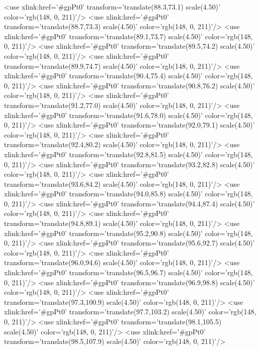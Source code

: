	<use xlink:href='#gpPt0' transform='translate(88.3,73.1) scale(4.50)' color='rgb(148,   0, 211)'/>
	<use xlink:href='#gpPt0' transform='translate(88.7,73.3) scale(4.50)' color='rgb(148,   0, 211)'/>
	<use xlink:href='#gpPt0' transform='translate(89.1,73.7) scale(4.50)' color='rgb(148,   0, 211)'/>
	<use xlink:href='#gpPt0' transform='translate(89.5,74.2) scale(4.50)' color='rgb(148,   0, 211)'/>
	<use xlink:href='#gpPt0' transform='translate(89.9,74.7) scale(4.50)' color='rgb(148,   0, 211)'/>
	<use xlink:href='#gpPt0' transform='translate(90.4,75.4) scale(4.50)' color='rgb(148,   0, 211)'/>
	<use xlink:href='#gpPt0' transform='translate(90.8,76.2) scale(4.50)' color='rgb(148,   0, 211)'/>
	<use xlink:href='#gpPt0' transform='translate(91.2,77.0) scale(4.50)' color='rgb(148,   0, 211)'/>
	<use xlink:href='#gpPt0' transform='translate(91.6,78.0) scale(4.50)' color='rgb(148,   0, 211)'/>
	<use xlink:href='#gpPt0' transform='translate(92.0,79.1) scale(4.50)' color='rgb(148,   0, 211)'/>
	<use xlink:href='#gpPt0' transform='translate(92.4,80.2) scale(4.50)' color='rgb(148,   0, 211)'/>
	<use xlink:href='#gpPt0' transform='translate(92.8,81.5) scale(4.50)' color='rgb(148,   0, 211)'/>
	<use xlink:href='#gpPt0' transform='translate(93.2,82.8) scale(4.50)' color='rgb(148,   0, 211)'/>
	<use xlink:href='#gpPt0' transform='translate(93.6,84.2) scale(4.50)' color='rgb(148,   0, 211)'/>
	<use xlink:href='#gpPt0' transform='translate(94.0,85.8) scale(4.50)' color='rgb(148,   0, 211)'/>
	<use xlink:href='#gpPt0' transform='translate(94.4,87.4) scale(4.50)' color='rgb(148,   0, 211)'/>
	<use xlink:href='#gpPt0' transform='translate(94.8,89.1) scale(4.50)' color='rgb(148,   0, 211)'/>
	<use xlink:href='#gpPt0' transform='translate(95.2,90.8) scale(4.50)' color='rgb(148,   0, 211)'/>
	<use xlink:href='#gpPt0' transform='translate(95.6,92.7) scale(4.50)' color='rgb(148,   0, 211)'/>
	<use xlink:href='#gpPt0' transform='translate(96.0,94.6) scale(4.50)' color='rgb(148,   0, 211)'/>
	<use xlink:href='#gpPt0' transform='translate(96.5,96.7) scale(4.50)' color='rgb(148,   0, 211)'/>
	<use xlink:href='#gpPt0' transform='translate(96.9,98.8) scale(4.50)' color='rgb(148,   0, 211)'/>
	<use xlink:href='#gpPt0' transform='translate(97.3,100.9) scale(4.50)' color='rgb(148,   0, 211)'/>
	<use xlink:href='#gpPt0' transform='translate(97.7,103.2) scale(4.50)' color='rgb(148,   0, 211)'/>
	<use xlink:href='#gpPt0' transform='translate(98.1,105.5) scale(4.50)' color='rgb(148,   0, 211)'/>
	<use xlink:href='#gpPt0' transform='translate(98.5,107.9) scale(4.50)' color='rgb(148,   0, 211)'/>

